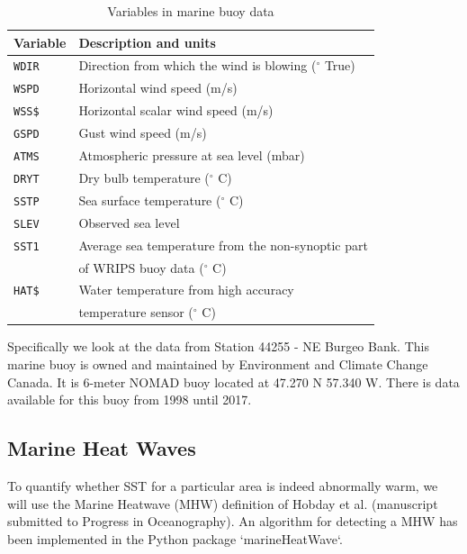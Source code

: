 \documentclass[12pt, letterpaper]{article}
\begin{document}
\begin{table}[h]
\begin{tabular}{|l|l|}
\hline
Variable & Description and units                                                      \\ \hline
\texttt{WDIR }    & Direction from which the wind is blowing ($^\circ$ True)                          \\
\texttt{WSPD}     & Horizontal wind speed (m/s)                                                \\
\texttt{WSS\$}    & Horizontal scalar wind speed (m/s)                                         \\
\texttt{GSPD}    & Gust wind speed (m/s)                                                      \\
\texttt{ATMS}     & Atmospheric pressure at sea level (mbar)                                   \\
\texttt{DRYT}     & Dry bulb temperature ($^\circ$ C)                                                  \\
\texttt{SSTP}     & Sea surface temperature ($^\circ$ C)                                               \\
\texttt{SLEV}     & Observed sea level                                                         \\
\texttt{SST1}     & Average sea temperature from the non-synoptic part \\
  & of WRIPS buoy data ($^\circ$ C) \\
\texttt{HAT\$}    & Water temperature from high accuracy \\ & temperature sensor ($^\circ$ C)               \\ \hline
\end{tabular}
\caption{Variables in marine buoy data}
\label{tbl:datafields}
\end{table}

Specifically we look at the data from Station 44255 - NE Burgeo Bank. This marine buoy is owned and maintained by Environment and Climate Change Canada. It is 6-meter NOMAD buoy located at 47.270 N 57.340 W.  There is data available for this buoy from 1998 until 2017.  

\subsection{Marine Heat Waves}

To quantify whether SST for a particular area is indeed abnormally warm, we will use the Marine Heatwave (MHW) definition of Hobday et al. (manuscript submitted to Progress in Oceanography).  An algorithm for detecting a MHW has been implemented in the Python package `marineHeatWave`.
\end{document}
